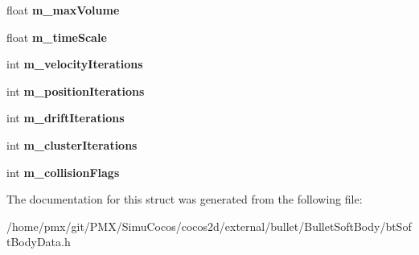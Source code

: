 \begin{DoxyCompactItemize}
float {\bfseries m\+\_\+max\+Volume}
\item 
\mbox{\label{structSoftBodyConfigData_a45179e535e69bffa509937203b8da3c9}} 
float {\bfseries m\+\_\+time\+Scale}
\item 
\mbox{\label{structSoftBodyConfigData_a7f9f9401ad2c59a1810f643992176ccd}} 
int {\bfseries m\+\_\+velocity\+Iterations}
\item 
\mbox{\label{structSoftBodyConfigData_a7c3d650184de6591dc1295194ba2c07f}} 
int {\bfseries m\+\_\+position\+Iterations}
\item 
\mbox{\label{structSoftBodyConfigData_a66565ccf03701e5c356b45c39c150bf6}} 
int {\bfseries m\+\_\+drift\+Iterations}
\item 
\mbox{\label{structSoftBodyConfigData_af2f3d83fcf5758b451b85977926b5520}} 
int {\bfseries m\+\_\+cluster\+Iterations}
\item 
\mbox{\label{structSoftBodyConfigData_a0930b2bd4642ac6338df24033ffd62a3}} 
int {\bfseries m\+\_\+collision\+Flags}
\end{DoxyCompactItemize}


The documentation for this struct was generated from the following file\+:\begin{DoxyCompactItemize}
\item 
/home/pmx/git/\+P\+M\+X/\+Simu\+Cocos/cocos2d/external/bullet/\+Bullet\+Soft\+Body/bt\+Soft\+Body\+Data.\+h\end{DoxyCompactItemize}
